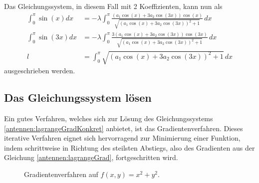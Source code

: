 Das Gleichungssystem, in diesem Fall mit 
2 Koeffizienten, kann nun als
\begin{equation}
	\begin{aligned}
		\int_0^\pi \sin (x) dx
		&=
		-\lambda \int_0^\pi \frac{\left(a_1 \cos (x)+3 a_2 \cos (3 x)\right) 
			\cos (x)}{\sqrt{\left(a_1 \cos (x)+3 a_2 \cos (3 x)\right)^2+1}} \, dx \\
		\int_0^\pi \sin (3 x) dx
		&=
		-\lambda \int_0^\pi \frac{3\left(a_1 \cos (x)+3 a_2 \cos (3 x)\right) 
			\cos (3 x)}{\sqrt{\left(a_1 \cos (x)+3 a_2 \cos (3 x)\right)^2+1}} \, dx \\
		l
		&=
		\int_0^\pi \sqrt{\left(a_1 \cos (x)+3 a_2 \cos (3 x)\right)^2+1} \, dx
	\end{aligned}
	\label{antennen:lagrangeGradKonkret}
\end{equation}
ausgeschrieben werden. 

\subsection{Das Gleichungssystem lösen\label{antennen:glSysSolve}}

Ein gutes Verfahren, welches sich zur Lösung des Gleichungssystems 
\eqref{antennen:lagrangeGradKonkret} anbietet, ist das Gradientenverfahren. Dieses 
iterative Verfahren eignet sich hervorragend zur Minimierung 
einer Funktion, indem schrittweise in Richtung des steilsten Abstiegs,
also des Gradienten aus der Gleichung \eqref{antennen:lagrangeGrad},
fortgeschritten wird. 

\begin{figure}
	\centering
	\caption{Gradientenverfahren auf $f(x,y)=x^2+y^2$.}
	\label{antennen:gradverfahrenBSP}
\end{figure}


